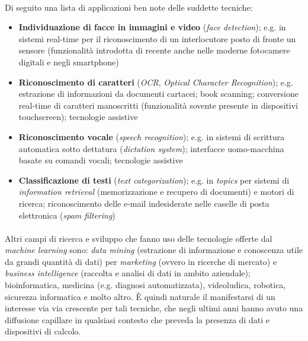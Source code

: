 \paragraph{}		
Di seguito una lista di applicazioni ben note delle suddette tecniche:
\begin{itemize}
\item{\textbf{Individuazione di facce in immagini e video} (\emph{face detection}); e.g. in sistemi real-time per il riconoscimento di un interlocutore posto di fronte un sensore (funzionalità introdotta di recente anche nelle moderne fotocamere digitali e negli smartphone}) \cite{hearst}
						
\item{\textbf{Riconoscimento di caratteri} (\emph{OCR}, \emph{Optical Character Recognition}); e.g. estrazione di informazioni da documenti cartacei; book scanning; conversione real-time di caratteri manoscritti (funzionalità sovente presente in dispositivi touchscreen); tecnologie assistive}

\item{\textbf{Riconoscimento vocale} (\textit{speech recognition}); e.g. in sistemi di scrittura automatica sotto dettatura (\textit{dictation system}); interfacce uomo-macchina basate su comandi vocali; tecnologie assistive}
			
\item{\textbf{Classificazione di testi} (\textit{text categorization}); e.g. in \textit{topics} per sistemi di \textit{information retrieval} \cite{hearst} (memorizzazione e recupero di documenti) e motori di ricerca; riconoscimento delle e-mail indesiderate nelle caselle di posta elettronica (\emph{spam filtering})}
			
\end{itemize}
		
\paragraph{}
Altri campi di ricerca e sviluppo che fanno uso delle tecnologie offerte dal \textit{machine learning} sono: \textit{data mining} (estrazione di informazione e conoscenza utile da grandi quantità di dati) per \textit{marketing} (ovvero in ricerche di mercato) e \textit{business intelligence }(raccolta e analisi di dati in ambito aziendale); bioinformatica, medicina (e.g. diagnosi automatizzata), videoludica, robotica, sicurezza informatica e molto altro.
È quindi naturale il manifestarsi di un interesse via via crescente per tali tecniche, che negli ultimi anni hanno avuto una diffusione capillare in qualsiasi contesto che preveda la presenza di dati e dispositivi di calcolo.
		

